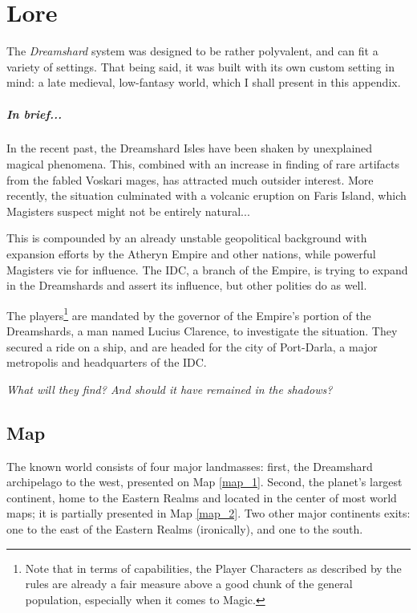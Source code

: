 \chapter{Lore}

The \textit{Dreamshard} system was designed to be rather polyvalent, and can fit a variety of settings. That being said, it was built with its own custom setting in mind: a late medieval, low-fantasy world, which I shall present in this appendix.

\paragraph{In brief...}

In the recent past, the Dreamshard Isles have been shaken by unexplained magical phenomena. This, combined with an increase in finding of rare artifacts from the fabled Voskari mages, has attracted much outsider interest. More recently, the situation culminated with a volcanic eruption on Faris Island, which Magisters suspect might not be entirely natural... 

This is compounded by an already unstable geopolitical background with expansion efforts by the Atheryn Empire and other nations, while powerful Magisters vie for influence. The IDC, a branch of the Empire, is trying to expand in the Dreamshards and assert its influence, but other polities do as well. 

The players\footnote{Note that in terms of capabilities, the Player Characters as described by the rules are already a fair measure above a good chunk of the general population, especially when it comes to Magic.} are mandated by the governor of the Empire's portion of the Dreamshards, a man named Lucius Clarence, to investigate the situation. They secured a ride on a ship, and are headed for the city of Port-Darla, a major metropolis and headquarters of the IDC.

\textit{What will they find? And should it have remained in the shadows?}


\section{Map}

The known world consists of four major landmasses: first, the Dreamshard archipelago to the west, presented on Map \ref{map_1}. Second, the planet's largest continent, home to the Eastern Realms and located in the center of most world maps; it is partially presented in Map \ref{map_2}. Two other major continents exits: one to the east of the Eastern Realms (ironically), and one to the south.


